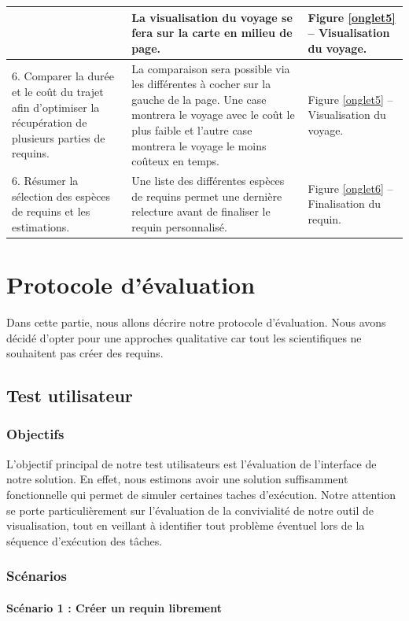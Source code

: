 \documentclass{article}
\begin{document}
\begin{center}
\begin{tabular}{|p{3.5cm}|p{7cm}|p{3.5cm}|}
		 &
		La visualisation du voyage se fera sur la carte en milieu de page.
		 &
		Figure \ref{onglet5} – Visualisation du voyage.
		\\\hline
		6. Comparer la durée et le coût du trajet afin d’optimiser la récupération de plusieurs parties de requins.
		 &
		La comparaison sera possible via les différentes à cocher sur la gauche de la page. Une case montrera le voyage avec le coût le plus faible et l’autre case montrera le voyage le moins coûteux en temps.
		 &
		Figure \ref{onglet5} – Visualisation du voyage.
		\\\hline
		6. Résumer la sélection des espèces de requins et les estimations.
		 &
		Une liste des différentes espèces de requins permet une dernière relecture avant de finaliser le requin personnalisé.
		 &
		Figure \ref{onglet6} – Finalisation du requin.
		\\\hline
	\end{tabular}
\end{center}

\section{Protocole d'évaluation}
Dans cette partie, nous allons décrire notre protocole d’évaluation. Nous avons décidé d'opter pour une approches qualitative car tout les scientifiques ne souhaitent pas créer des requins.

\subsection{Test utilisateur}

\subsubsection{Objectifs}
L'objectif principal de notre test utilisateurs est l'évaluation de l'interface de notre solution. En effet, nous estimons avoir une solution suffisamment fonctionnelle qui permet de simuler certaines taches d'exécution.
Notre attention se porte particulièrement sur l'évaluation de la convivialité de notre outil de visualisation, tout en veillant à identifier tout problème éventuel lors de la séquence d'exécution des tâches.

\subsubsection{Scénarios}

\paragraph{Scénario 1 : Créer un requin librement}
\end{document}
